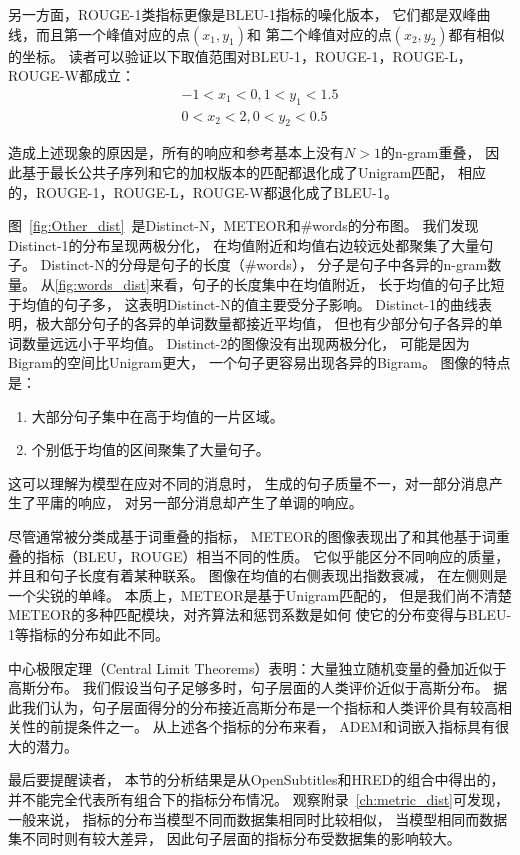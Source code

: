 另一方面，ROUGE-1类指标更像是BLEU-1指标的噪化版本，
它们都是双峰曲线，而且第一个峰值对应的点$(x_1, y_1)$和
第二个峰值对应的点$(x_2, y_2)$都有相似的坐标。
读者可以验证以下取值范围对BLEU-1，ROUGE-1，ROUGE-L，ROUGE-W都成立：
\begin{align}
    -1 < x_1 < 0, 1 < y_1 < 1.5 \\
    0 < x_2 < 2, 0 < y_2 < 0.5
\end{align}

造成上述现象的原因是，所有的响应和参考基本上没有$N > 1$的n-gram重叠，
因此基于最长公共子序列和它的加权版本的匹配都退化成了Unigram匹配，
相应的，ROUGE-1，ROUGE-L，ROUGE-W都退化成了BLEU-1。


图~\ref{fig:Other_dist}~是Distinct-N，METEOR和\#words的分布图。
我们发现Distinct-1的分布呈现两极分化，
在均值附近和均值右边较远处都聚集了大量句子。
Distinct-N的分母是句子的长度（\#words），
分子是句子中各异的n-gram数量。
从\ref{fig:words_dist}来看，句子的长度集中在均值附近，
长于均值的句子比短于均值的句子多，
这表明Distinct-N的值主要受分子影响。
Distinct-1的曲线表明，极大部分句子的各异的单词数量都接近平均值，
但也有少部分句子各异的单词数量远远小于平均值。
Distinct-2的图像没有出现两极分化，
可能是因为Bigram的空间比Unigram更大，
一个句子更容易出现各异的Bigram。
图像的特点是：
\begin{enumerate}
    \item 大部分句子集中在高于均值的一片区域。
    \item 个别低于均值的区间聚集了大量句子。
\end{enumerate}
这可以理解为模型在应对不同的消息时，
生成的句子质量不一，对一部分消息产生了平庸的响应，
对另一部分消息却产生了单调的响应。

尽管通常被分类成基于词重叠的指标，
METEOR的图像表现出了和其他基于词重叠的指标（BLEU，ROUGE）相当不同的性质。
它似乎能区分不同响应的质量，并且和句子长度有着某种联系。
图像在均值的右侧表现出指数衰减， 在左侧则是一个尖锐的单峰。
本质上，METEOR是基于Unigram匹配的，
但是我们尚不清楚METEOR的多种匹配模块，对齐算法和惩罚系数是如何
使它的分布变得与BLEU-1等指标的分布如此不同。

中心极限定理（Central Limit Theorems）表明：大量独立随机变量的叠加近似于高斯分布。
我们假设当句子足够多时，句子层面的人类评价近似于高斯分布。
据此我们认为，句子层面得分的分布接近高斯分布是一个指标和人类评价具有较高相关性的前提条件之一。
从上述各个指标的分布来看， ADEM和词嵌入指标具有很大的潜力。

最后要提醒读者，
本节的分析结果是从OpenSubtitles和HRED的组合中得出的，
并不能完全代表所有组合下的指标分布情况。
观察附录~\ref{ch:metric_dist}可发现， 一般来说，
指标的分布当模型不同而数据集相同时比较相似，
当模型相同而数据集不同时则有较大差异，
因此句子层面的指标分布受数据集的影响较大。

